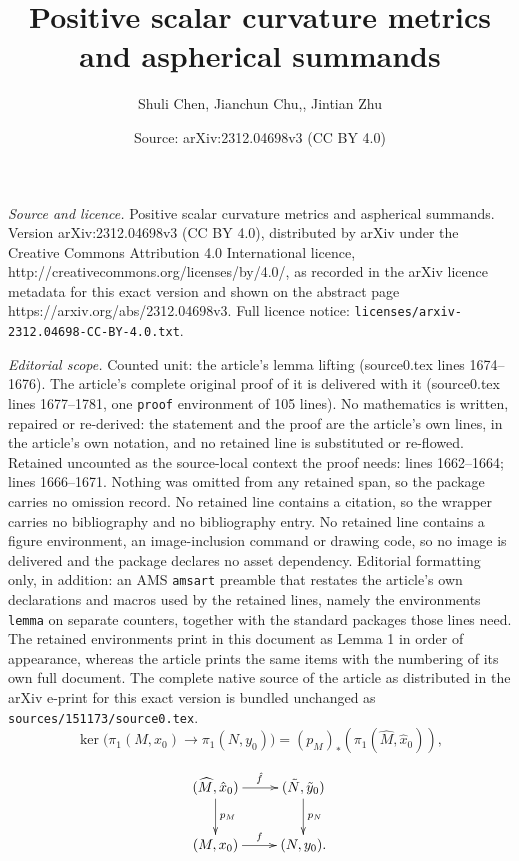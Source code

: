 \documentclass[10pt,a4paper]{amsart}
\title{Positive scalar curvature metrics and aspherical summands}
\author{Shuli Chen, Jianchun Chu,, Jintian Zhu}
\date{Source: arXiv:2312.04698v3 (CC BY 4.0)}
\begin{document}
\maketitle

\noindent\emph{Source and licence.} Positive scalar curvature metrics and aspherical summands. Version arXiv:2312.04698v3 (CC BY 4.0), distributed by arXiv under the Creative Commons Attribution 4.0 International licence, http://creativecommons.org/licenses/by/4.0/, as recorded in the arXiv licence metadata for this exact version and shown on the abstract page https://arxiv.org/abs/2312.04698v3. Full licence notice: \texttt{licenses/arxiv-2312.04698-CC-BY-4.0.txt}.\par\smallskip

\noindent\textit{Editorial scope.} Counted unit: the article's lemma lifting (source0.tex lines 1674--1676). The article's complete original proof of it is delivered with it (source0.tex lines 1677--1781, one \texttt{proof} environment of 105 lines). No mathematics is written, repaired or re-derived: the statement and the proof are the article's own lines, in the article's own notation, and no retained line is substituted or re-flowed.  Retained uncounted as the source-local context the proof needs: lines 1662--1664; lines 1666--1671.  Nothing was omitted from any retained span, so the package carries no omission record.  No retained line contains a citation, so the wrapper carries no bibliography and no bibliography entry.  No retained line contains a figure environment, an image-inclusion command or drawing code, so no image is delivered and the package declares no asset dependency.  Editorial formatting only, in addition: an AMS \texttt{amsart} preamble that restates the article's own declarations and macros used by the retained lines, namely the environments \texttt{lemma} on separate counters, together with the standard packages those lines need.  The retained environments print in this document as Lemma 1 in order of appearance, whereas the article prints the same items with the numbering of its own full document.  The complete native source of the article as distributed in the arXiv e-print for this exact version is bundled unchanged as \texttt{sources/151173/source0.tex}.
\begin{equation}\label{Eq: lifting}
\ker\big(\pi_1(M,x_0)\to \pi_1(N,y_0)\big)=(p_M)_*(\pi_1(\widehat M,\hat x_0)),
\end{equation}

\begin{equation}\label{Eq: lifting diagram}
\begin{split}
\xymatrix{(\widehat M,\hat x_0)\ar[r]^{\hat f}\ar[d]^{p_M}&(\tilde N,\tilde y_0)\ar[d]^{p_N}\\
(M,x_0)\ar[r]^{f}&(N,y_0).}
\end{split}
\end{equation}
\end{document}
